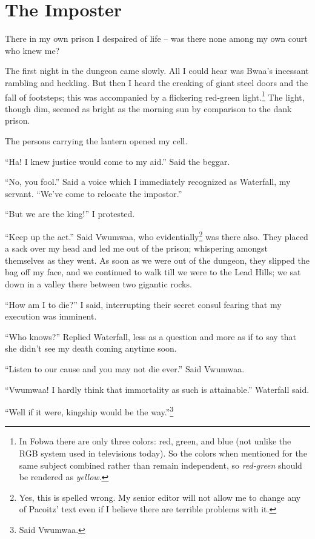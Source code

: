 \chapter{The Imposter}

There in my own prison I despaired of life -- was there none among my own court who knew me?

The first night in the dungeon came slowly. All I could hear was Bwaa's incessant rambling and heckling. But then I heard the creaking of giant steel doors and the fall of footsteps; this was accompanied by a flickering red-green light.\footnote{In Fobwa there are only three colors: red, green, and blue (not unlike the RGB system used in televisions today). So the colors when mentioned for the same subject combined rather than remain independent, so \emph{red-green} should be rendered as \emph{yellow}.}
The light, though dim, seemed as bright as the morning sun by comparison to the dank prison.

The persons carrying the lantern opened my cell.

``Ha! I knew justice would come to my aid.'' Said the beggar.

``No, you fool.'' Said a voice which I immediately recognized as Waterfall, my servant. ``We've come to relocate the impostor.''

``But we are the king!'' I protested.

``Keep up the act.'' Said Vwumwaa, who evidentially\footnote{Yes, this is spelled wrong. My senior editor will not allow me to change any of Pacoitz' text even if I believe there are terrible problems with it.} was there also. They placed a sack over my head and led me out of the prison; whispering amongst themselves as they went. As soon as we were out of the dungeon, they slipped the bag off my face, and we continued to walk till we were to the Lead Hills; we sat down in a valley there between two gigantic rocks.

``How am I to die?'' I said, interrupting their secret consul fearing that my execution was imminent.

``Who knows?'' Replied Waterfall, less as a question and more as if to say that she didn't see my death coming anytime soon.

``Listen to our cause and you may not die ever.'' Said Vwumwaa.

``Vwumwaa! I hardly think that immortality as such is attainable.'' Waterfall said.

``Well if it were, kingship would be the way.''\footnote{Said Vwumwaa.}

